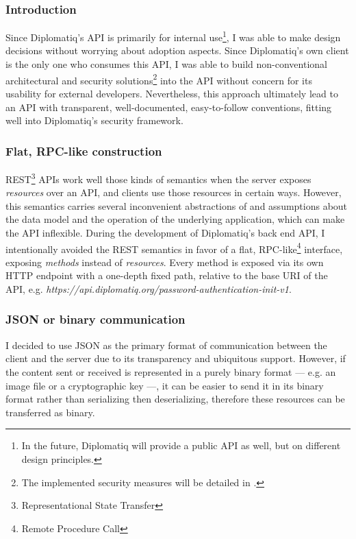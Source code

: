 \subsubsection{Introduction}

Since Diplomatiq's API is primarily for internal use\footnote{In the future, Diplomatiq will provide a public API as well, but on different design principles.}, I was able to make design decisions without worrying about adoption aspects. Since Diplomatiq's own client is the only one who consumes this API, I was able to build non-conventional architectural and security solutions\footnote{The implemented security measures will be detailed in .} into the API without concern for its usability for external developers. Nevertheless, this approach ultimately lead to an API with transparent, well-documented, easy-to-follow conventions, fitting well into Diplomatiq's security framework.

\subsubsection{Flat, RPC-like construction}

REST\footnote{Representational State Transfer} APIs work well those kinds of semantics when the server exposes \emph{resources} over an API, and clients use those resources in certain ways. However, this semantics carries several inconvenient abstractions of and assumptions about the data model and the operation of the underlying application, which can make the API inflexible. During the development of Diplomatiq's back end API, I intentionally avoided the REST semantics in favor of a flat, RPC-like\footnote{Remote Procedure Call} interface, exposing \emph{methods} instead of \emph{resources}. Every method is exposed via its own HTTP endpoint with a one-depth fixed path, relative to the base URI of the API, e.g. \emph{https://api.diplomatiq.org/password-authentication-init-v1}.

\subsubsection{JSON or binary communication}

I decided to use JSON as the primary format of communication between the client and the server due to its transparency and ubiquitous support. However, if the content sent or received is represented in a purely binary format — e.g. an image file or a cryptographic key —, it can be easier to send it in its binary format rather than serializing then deserializing, therefore these resources can be transferred as binary.

